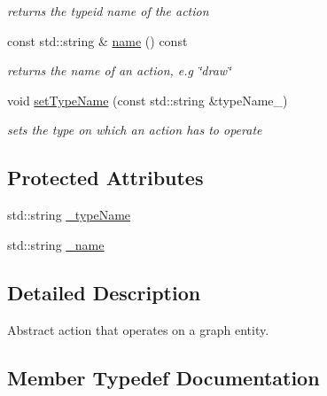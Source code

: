 \begin{DoxyCompactItemize}
\begin{DoxyCompactList}\small\item\em returns the typeid name of the action \end{DoxyCompactList}\item 
const std\+::string \& \mbox{\hyperlink{classg2o_1_1_hyper_graph_element_action_aee0238f29b377b432c61e842ba6327ac}{name}} () const
\begin{DoxyCompactList}\small\item\em returns the name of an action, e.\+g \char`\"{}draw\char`\"{} \end{DoxyCompactList}\item 
void \mbox{\hyperlink{classg2o_1_1_hyper_graph_element_action_ae7ed5834d50fb0ff0fef8ec45caaaa3f}{set\+Type\+Name}} (const std\+::string \&type\+Name\+\_\+)
\begin{DoxyCompactList}\small\item\em sets the type on which an action has to operate \end{DoxyCompactList}\end{DoxyCompactItemize}
\subsection*{Protected Attributes}
\begin{DoxyCompactItemize}
\item 
std\+::string \mbox{\hyperlink{classg2o_1_1_hyper_graph_element_action_ae05082e218d213f8db5de7a79769f97c}{\+\_\+type\+Name}}
\item 
std\+::string \mbox{\hyperlink{classg2o_1_1_hyper_graph_element_action_a31245b0a79dfb357e3b345ff57b7b491}{\+\_\+name}}
\end{DoxyCompactItemize}


\subsection{Detailed Description}
Abstract action that operates on a graph entity. 

\subsection{Member Typedef Documentation}
\mbox{\label{classg2o_1_1_hyper_graph_element_action_abc889fc90ae1bbb63d90c7993777417a}} 
